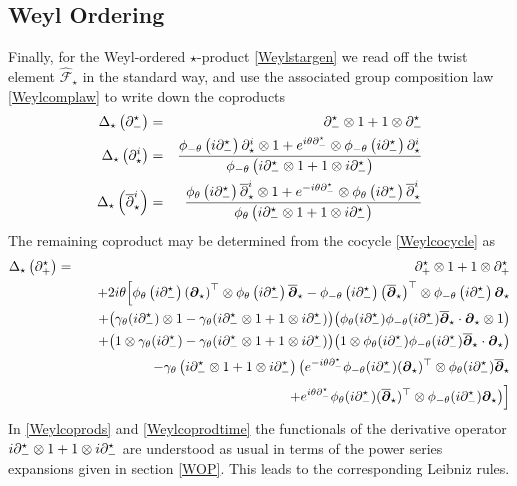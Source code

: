 \subsection{Weyl Ordering}
\label{WOcoprod}
Finally, for the Weyl-ordered $\star$-product \eqref{Weylstargen} we read off
the twist element $\hat{\mathcal F}_\star$ in the standard way, and use the
associated group composition law \eqref{Weylcomplaw} to write down the
coproducts
\begin{eqnarray}
  \label{Weylcoprods}
  \Delta_\star\left(\partial_-^\star\right)&=&\partial_-^\star\otimes1+
1\otimes\partial_-^\star \\\nonumber
\Delta_\star\left(\partial^i_\star\right)&=& \frac{\phi_{-\theta}\left( i
\partial_-^\star\right) \partial^i_\star\otimes1+ e^{ i\theta \partial_-^\star}
\otimes\phi_{-\theta}\left( i\partial_-^\star\right) \partial^i_\star}
{\phi_{-\theta}\left( i\partial_-^\star\otimes1+1\otimes i
\partial_-^\star\right)}\\\nonumber
\Delta_\star\left( \overline{\partial}^{ i}_\star\right)&=&
 \frac{\phi_{\theta}\left( i
\partial_-^\star\right) \overline{\partial}^{ i}_\star\otimes1+
 e^{- i\theta \partial_-^\star}
\otimes\phi_{\theta}\left( i\partial_-^\star\right) 
\overline{\partial}^{ i}_\star}
{\phi_{\theta}\left( i\partial_-^\star\otimes1+1\otimes i
\partial_-^\star\right)}
\end{eqnarray}
The remaining coproduct may be determined from the cocycle
\eqref{Weylcocycle} as
\begin{eqnarray}
  \label{Weylcoprodtime}
  \Delta_\star\left(\partial_+^\star\right)&=&\partial_+^\star\otimes1+
1\otimes\partial_+^\star \\\nonumber &&+ 2 i\theta \Bigl[
\phi_\theta\left( i\partial_-^\star\right) \left({{\boldsymbol {\partial} }}_\star
\right)^\top\otimes\phi_\theta\left( i\partial_-^\star\right) 
\overline{{{\boldsymbol {\partial} }}}_\star-\phi_{-\theta}\left( i\partial_-^\star
\right) \left( \overline{{{\boldsymbol {\partial} }}}_\star
\right)^\top\otimes\phi_{-\theta}\left( i\partial_-^\star\right) 
{{\boldsymbol {\partial} }}_\star\Bigr.
\\\nonumber &&\quad
+ \bigl(\gamma_\theta( i\partial_-^\star)\otimes1-
\gamma_\theta( i\partial_-^\star\otimes1+
1\otimes i\partial_-^\star)\bigr)\bigl(\phi_\theta( i\partial_-^\star)
 \phi_{-\theta}( i\partial_-^\star) \overline{{{\boldsymbol {\partial} }}}_\star
\cdot{{\boldsymbol {\partial} }}_\star\otimes1\bigr) \\\nonumber &&\quad
+ \bigl(1\otimes\gamma_\theta( i\partial_-^\star)-
\gamma_\theta( i\partial_-^\star\otimes1+
1\otimes i\partial_-^\star)\bigr)\bigl(1\otimes
\phi_\theta( i\partial_-^\star)
 \phi_{-\theta}( i\partial_-^\star) \overline{{{\boldsymbol {\partial} }}}_\star
\cdot{{\boldsymbol {\partial} }}_\star\bigr) \\\nonumber &&\quad -\Bigl.\gamma_\theta\left(
 i\partial_-^\star\otimes1+1\otimes i\partial_-^\star\right)
\bigl( e^{- i\theta \partial_-^\star} \phi_{-\theta}( i
\partial_-^\star) ({{\boldsymbol {\partial} }}_\star)^\top\otimes\phi_\theta( i
\partial_-^\star) \overline{{{\boldsymbol {\partial} }}}_\star\bigr.\\\nonumber &&
\quad\qquad\qquad\qquad\qquad\qquad\qquad+\bigl. e^{ i\theta 
\partial_-^\star} \phi_{\theta}( i
\partial_-^\star) ( \overline{{{\boldsymbol {\partial} }}}_\star)^\top\otimes
\phi_{-\theta}( i\partial_-^\star) {{\boldsymbol {\partial} }}_\star\bigr)\Bigr]
\end{eqnarray}
In \eqref{Weylcoprods} and \eqref{Weylcoprodtime} the functionals of the
derivative operator $ i\partial_-^\star\otimes1 +1\otimes i\partial_-^\star$ are
understood as usual in terms of the power series expansions given in section
\ref{WOP}. This leads to the corresponding Leibniz rules.

